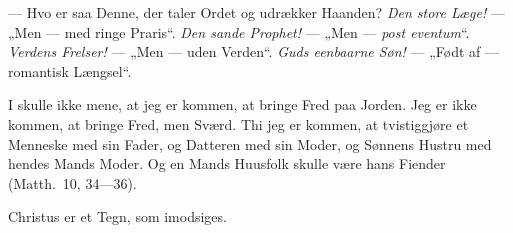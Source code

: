 \documentclass[12pt,a4paper]{book}
\begin{document}
--- Hvo er saa Denne, der taler Ordet og udrækker Haanden? \emph{Den store
Læge!} --- „Men --- med ringe Praris“.
\emph{Den sande Prophet!} --- „Men --- \textit{post eventum}“.
\emph{Verdens Frelser!} --- „Men --- uden Verden“. \emph{Guds eenbaarne Søn!}
--- „Født af --- romantisk Længsel“.

\begingroup\large
I skulle ikke mene, at jeg er kommen, at bringe Fred paa Jorden. Jeg er ikke
kommen, at bringe Fred, men Sværd. Thi jeg er kommen, at tvistiggjøre et
Menneske med sin Fader, og Datteren med sin Moder, og Sønnens Hustru med hendes
Mands Moder. Og en Mands Huusfolk skulle være hans Fiender (Matth.\ 10, 34---36).
\par\endgroup

Christus er et Tegn, som imodsiges.

\end{document}
